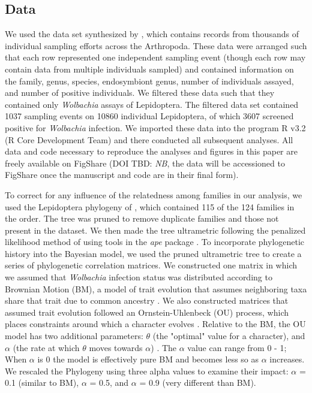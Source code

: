 \documentclass{frontiersSCNS}
\begin{document}
\subsection{Data}
We used the data set synthesized by \citet{Weinert:2015aa}, which contains records from thousands of individual sampling efforts across the Arthropoda.  These data were arranged such that each row represented one independent sampling event (though each row may contain data from multiple individuals sampled) and contained information on the family, genus, species, endosymbiont genus, number of individuals assayed, and number of positive individuals. We filtered these data such that they contained only \textit{Wolbachia} assays of Lepidoptera. The filtered data set contained 1037 sampling events on 10860 individual Lepidoptera, of which 3607 screened positive for \textit{Wolbachia} infection. We imported these data into the program R v3.2 (R Core Development Team) and there conducted all subsequent analyses. All data and code necessary to reproduce the analyses and figures in this paper are freely available on FigShare (DOI TBD: \textit{NB}, the data will be accessioned to FigShare once the manuscript and code are in their final form).

To correct for any influence of the relatedness among families in our analysis, we used the Lepidoptera phylogeny of \citet{Regier:2013fp}, which contained 115 of the 124 families in the order. The tree was pruned to remove duplicate families and those not present in the  \cite{Weinert:2015aa} dataset. We then made the tree ultrametric following the penalized likelihood method of \citet{Sanderson:2002vy} using tools in the \textit{ape} package \citep{Paradis:2004dv}. To incorporate phylogenetic history into the Bayesian model, we used the pruned ultrametric tree to create a series of phylogenetic correlation matrices. We constructed one matrix in which we assumed that \textit{Wolbachia} infection status was distributed according to Brownian Motion (BM), a model of trait evolution that assumes neighboring taxa share that trait due to common ancestry \citep{Paradis:2012wn}. We also constructed matrices that assumed trait evolution followed an Ornstein-Uhlenbeck (OU) process, which places constraints around which a character evolves \citep{Paradis:2012wn}. Relative to the BM, the OU model has two additional parameters: $\theta$ (the "optimal" value for a character), and $\alpha$ (the rate at which $\theta$ moves towards $\alpha$) \citep{Paradis:2012wn}. The $\alpha$ value can range from 0 - 1; When $\alpha$ is 0 the model is effectively pure BM and becomes less so as $\alpha$ increases. We rescaled the Phylogeny using three alpha values to examine their impact: $\alpha$ = 0.1 (similar to BM), $\alpha$ = 0.5, and $\alpha$ = 0.9 (very different than BM).
\end{document}
